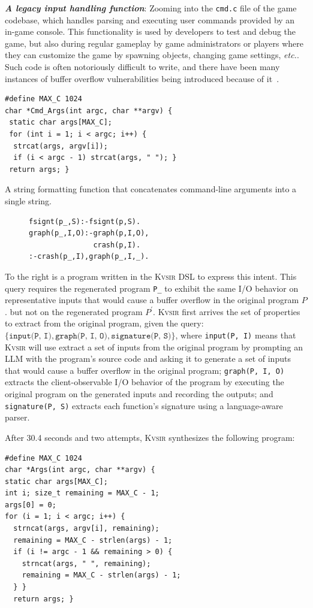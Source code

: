 \documentclass[sigplan,review,anonymous,10pt]{acmart}
\def\etc{{\em etc.}\xspace}
\newcommand{\sys}{{\scshape Kv{\textalpha}sir}\xspace}
\newcommand{\heading}[1]{\vspace{2pt}\noindent\textbf{\emph{#1}}:\enspace}
\newcommand{\ttt}[1]{\texttt{#1}\xspace}
\begin{document}
\heading{A legacy input handling function}
Zooming into the \ttt{cmd.c} file of the game codebase, 
which handles parsing and executing user commands provided by an in-game console.
This functionality is used by developers to test and debug the game, but also during regular gameplay
by game administrators or players where they can customize the game by spawning objects, changing game settings, \etc.
Such code is often notoriously difficult to write,
and there have been many instances of buffer overflow vulnerabilities being introduced because of it~\cite{CVE-2006-3400, CVE-2006-3401, CVE-2007-5248, CVE-2019-1010043}.
\begin{listing}
\begin{verbatim}
#define MAX_C 1024
char *Cmd_Args(int argc, char **argv) {
 static char args[MAX_C];
 for (int i = 1; i < argc; i++) {
  strcat(args, argv[i]);
  if (i < argc - 1) strcat(args, " "); }
 return args; }
\end{verbatim}
\caption{A string formatting function that concatenates command-line arguments into a single string.}
\end{listing}

\begin{figure}
\begin{verbatim}
fsignt(p_,S):-fsignt(p,S).
graph(p_,I,O):-graph(p,I,O),
               crash(p,I).
:-crash(p_,I),graph(p_,I,_).
\end{verbatim}
\end{figure}
To the right is a program written in the \sys DSL to express this intent.
This query requires the regenerated program \texttt{P\_} to exhibit the same
I/O behavior on representative inputs that would cause a buffer overflow in the original program $P$.
but not on the regenerated program $P^\prime$.
\sys first arrives the set of properties to extract from the
original program, given the query:
$\{\ttt{input(P, I)}, \ttt{graph(P, I, O)}, \ttt{signature(P, S)}\}$, where
\texttt{input(P, I)} means that \sys will use extract a set of inputs from the original program
by prompting an LLM with the program's source code and asking it to generate a set of inputs that
would cause a buffer overflow in the original program;
\texttt{graph(P, I, O)} extracts the client-observable I/O behavior of the program
by executing the original program on the generated inputs and recording the outputs;
and \texttt{signature(P, S)} extracts each function's signature using a language-aware parser.

After 30.4 seconds and two attempts, \sys synthesizes the following program:
\begin{verbatim}
#define MAX_C 1024
char *Args(int argc, char **argv) {
static char args[MAX_C];
int i; size_t remaining = MAX_C - 1;
args[0] = 0;
for (i = 1; i < argc; i++) {
  strncat(args, argv[i], remaining);
  remaining = MAX_C - strlen(args) - 1;
  if (i != argc - 1 && remaining > 0) {
    strncat(args, " ", remaining);
    remaining = MAX_C - strlen(args) - 1;
  } }
  return args; }
\end{verbatim}
\end{document}

